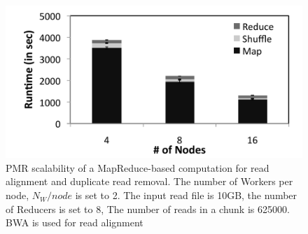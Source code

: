 \documentclass{acm_proc_article-sp}
\begin{document}
\begin{figure}
\end{figure}




\begin{figure}
 \centering
\includegraphics[scale=0.54]{figures/scale-up-bw.pdf} 
\caption{\small PMR scalability of a MapReduce-based computation for
  read alignment and duplicate read removal.  The number of Workers
  per node, $N_{W}/node$ is set to 2.  The input read file is 10GB,
  the number of Reducers is set to 8, The number of reads in a chunk
  is 625000. BWA is used for read alignment}

  \label{fig:scale-p-saga-mr} 
\end{figure}
\end{document}
